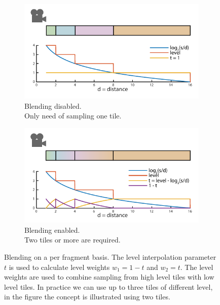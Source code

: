 \documentclass[journal]{vgtc}                %
\begin{document}
\begin{figure}
    \centering
    \begin{subfigure}[tb]{0.24\textwidth}
    	\includegraphics[width=\textwidth]{figures/blending1b.pdf}
	\caption{Blending disabled.\\ Only need of sampling one tile.}
    \end{subfigure}
    \begin{subfigure}[tb]{0.24\textwidth}
    	\includegraphics[width=\textwidth]{figures/blending2b.pdf}
	\caption{Blending enabled.\\Two tiles or more are required.}
    \end{subfigure}
    \caption{Blending on a per fragment basis. The level interpolation parameter $t$ is used to calculate level weights $w_1 = 1-t$ and $w_2 = t$. The level weights are used to combine sampling from high level tiles with low level tiles. In practice we can use up to three tiles of different level, in the figure the concept is illustrated using two tiles.}  \vspace{-4mm}
    \label{fig:switchingblending}
\end{figure}
\end{document}
